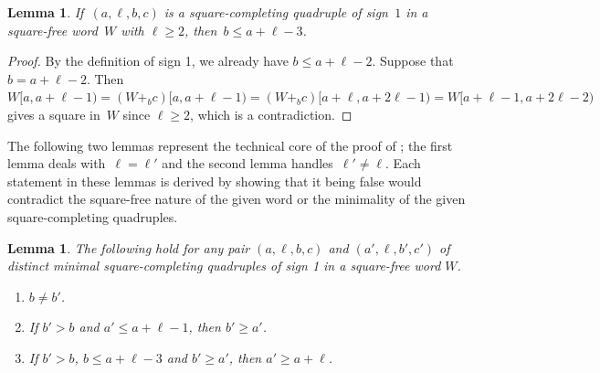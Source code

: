 \documentclass[12pt]{article}
\theoremstyle{plain}
\newtheorem{lemma}[theorem]{Lemma}
\theoremstyle{definition}
\begin{document}
	\begin{lemma} \label{lem:scq-insertion-no-right-edge}
		If~$(a,\ell,b,c)$ is a square-completing quadruple of sign~$1$ in a square-free word~$W$ with $\ell\ge 2$, then~$b\le a+\ell-3$.
	\end{lemma}
	
	\begin{proof}
		By the definition of sign 1, we already have $b\le a+\ell-2$. Suppose that~$b=a+\ell-2$. Then~$W[a,a+\ell-1)=(W+_bc)[a,a+\ell-1)=(W+_bc)[a+\ell,a+2\ell-1)=W[a+\ell-1,a+2\ell-2)$ gives a square in~$W$ since $\ell\ge 2$, which is a contradiction.
	\end{proof}
	
	The following two lemmas represent the technical core of the proof of ; the first lemma deals with~$\ell=\ell'$ and the second lemma handles~$\ell'\ne\ell$. Each statement in these lemmas is derived by showing that it being false would contradict the square-free nature of the given word or the minimality of the given square-completing quadruples.
	
	\begin{lemma} \label{lem:same-length-mscq-outcomes}
		The following hold for any pair $(a,\ell,b,c)$ and $(a',\ell,b',c')$ of distinct minimal square-completing quadruples of sign 1 in a square-free word $W$.
		\begin{enumerate}
			\item \label{item:same-length-mscq-insertion-offset} $b\ne b'$.
			\item \label{item:same-length-mscq-insertion-no-left-edge} If $b'>b$ and $a'\le a+\ell-1$, then $b'\ge a'$.
			\item \label{item:same-length-mscq-spacing} If $b'>b$, $b\le a+\ell-3$ and $b'\ge a'$, then $a'\ge a+\ell$.
		\end{enumerate}
	\end{lemma}
	
\end{document}
